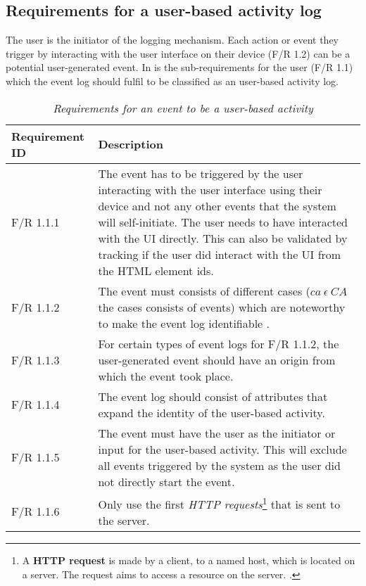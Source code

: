\subsection{Requirements for a user-based activity log}\label{sec:ch2_requirementsOfUAT}
The user is the initiator of the logging mechanism. Each action or event they trigger by interacting with the user interface on their device (F/R 1.2) can be a potential user-generated event. In
 is the sub-requirements for the user (F/R 1.1) which the event log should fulfil to be classified as an user-based activity log.

\begin{table}[!htb]
	\centering
	\caption[Requirements for an event to be a user-based activity]
	{\textit{Requirements for an event to be a user-based activity}}
	\label{tbl:ch2_requirementsForUserActivtyEvent}
	\begin{tabularx}{\textwidth}{|l|X|}
		\hline \textbf{Requirement ID} & \textbf{Description}\\
		\hline F/R 1.1.1 & The event has to be triggered by the user interacting with the user interface using their device and not any other events that the system will self-initiate. The user needs to have interacted with the UI directly. This can also be validated by tracking if the user did interact with the UI from the HTML element ids. \\
		\hline F/R 1.1.2 & The event must consists of different cases ($ca~ \epsilon~CA$ the cases consists of events) which are noteworthy to make the event log identifiable \cite{Slaninova2014}. \\
		\hline F/R 1.1.3 & For certain types of event logs for F/R 1.1.2, the user-generated event should have an origin from which the event took place. \\
		\hline F/R 1.1.4 & The event log should consist of attributes that expand the identity of the user-based activity. \\
		\hline F/R 1.1.5 & The event must have the user as the initiator or input for the user-based activity. This will exclude all events triggered by the system as the user did not directly start the event. \\
		\hline F/R 1.1.6 & Only use the first \textit{HTTP requests}\footnote{A \textbf{HTTP request} is made by a client, to a named host, which is located on a server. The request aims to access a resource on the server. \cite{IBM2021}.} that is sent to the server. \\ 
		\hline
	\end{tabularx}
\end{table}

